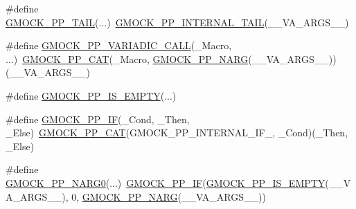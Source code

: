 \begin{DoxyCompactItemize}
\item 
\#define \mbox{\hyperlink{googletest-master_2googlemock_2include_2gmock_2internal_2gmock-pp_8h_a1373615930e6eb6772c914fa8416f88e}{G\+M\+O\+C\+K\+\_\+\+P\+P\+\_\+\+T\+A\+IL}}(...)~\mbox{\hyperlink{_obj__test_2lib_2googletest-master_2googlemock_2include_2gmock_2internal_2gmock-pp_8h_a0e7741e9333e33780a56a8c5e2079942}{G\+M\+O\+C\+K\+\_\+\+P\+P\+\_\+\+I\+N\+T\+E\+R\+N\+A\+L\+\_\+\+T\+A\+IL}}(\+\_\+\+\_\+\+V\+A\+\_\+\+A\+R\+G\+S\+\_\+\+\_\+)
\item 
\#define \mbox{\hyperlink{googletest-master_2googlemock_2include_2gmock_2internal_2gmock-pp_8h_a4dd8715f753c7c3957f7185acf609e55}{G\+M\+O\+C\+K\+\_\+\+P\+P\+\_\+\+V\+A\+R\+I\+A\+D\+I\+C\+\_\+\+C\+A\+LL}}(\+\_\+\+Macro, ...)~\mbox{\hyperlink{_obj__test_2lib_2googletest-master_2googlemock_2include_2gmock_2internal_2gmock-pp_8h_a108c52ffa81ab99348d23b8fa76fded3}{G\+M\+O\+C\+K\+\_\+\+P\+P\+\_\+\+C\+AT}}(\+\_\+\+Macro, \mbox{\hyperlink{_obj__test_2lib_2googletest-master_2googlemock_2include_2gmock_2internal_2gmock-pp_8h_a9db18220b88597a07704bc7cf3b13304}{G\+M\+O\+C\+K\+\_\+\+P\+P\+\_\+\+N\+A\+RG}}(\+\_\+\+\_\+\+V\+A\+\_\+\+A\+R\+G\+S\+\_\+\+\_\+))(\+\_\+\+\_\+\+V\+A\+\_\+\+A\+R\+G\+S\+\_\+\+\_\+)
\item 
\#define \mbox{\hyperlink{googletest-master_2googlemock_2include_2gmock_2internal_2gmock-pp_8h_a14eb10c5cc7380d072cd748661140f45}{G\+M\+O\+C\+K\+\_\+\+P\+P\+\_\+\+I\+S\+\_\+\+E\+M\+P\+TY}}(...)
\item 
\#define \mbox{\hyperlink{googletest-master_2googlemock_2include_2gmock_2internal_2gmock-pp_8h_a82f153fedbaf56bf71b8272bdf672875}{G\+M\+O\+C\+K\+\_\+\+P\+P\+\_\+\+IF}}(\+\_\+\+Cond,  \+\_\+\+Then,  \+\_\+\+Else)~\mbox{\hyperlink{_obj__test_2lib_2googletest-master_2googlemock_2include_2gmock_2internal_2gmock-pp_8h_a108c52ffa81ab99348d23b8fa76fded3}{G\+M\+O\+C\+K\+\_\+\+P\+P\+\_\+\+C\+AT}}(G\+M\+O\+C\+K\+\_\+\+P\+P\+\_\+\+I\+N\+T\+E\+R\+N\+A\+L\+\_\+\+I\+F\+\_\+, \+\_\+\+Cond)(\+\_\+\+Then, \+\_\+\+Else)
\item 
\#define \mbox{\hyperlink{googletest-master_2googlemock_2include_2gmock_2internal_2gmock-pp_8h_a0f49faf3c63534a722e2f320ff8d4cd0}{G\+M\+O\+C\+K\+\_\+\+P\+P\+\_\+\+N\+A\+R\+G0}}(...)~\mbox{\hyperlink{_obj__test_2lib_2googletest-master_2googlemock_2include_2gmock_2internal_2gmock-pp_8h_a82f153fedbaf56bf71b8272bdf672875}{G\+M\+O\+C\+K\+\_\+\+P\+P\+\_\+\+IF}}(\mbox{\hyperlink{_obj__test_2lib_2googletest-master_2googlemock_2include_2gmock_2internal_2gmock-pp_8h_a14eb10c5cc7380d072cd748661140f45}{G\+M\+O\+C\+K\+\_\+\+P\+P\+\_\+\+I\+S\+\_\+\+E\+M\+P\+TY}}(\+\_\+\+\_\+\+V\+A\+\_\+\+A\+R\+G\+S\+\_\+\+\_\+), 0, \mbox{\hyperlink{_obj__test_2lib_2googletest-master_2googlemock_2include_2gmock_2internal_2gmock-pp_8h_a9db18220b88597a07704bc7cf3b13304}{G\+M\+O\+C\+K\+\_\+\+P\+P\+\_\+\+N\+A\+RG}}(\+\_\+\+\_\+\+V\+A\+\_\+\+A\+R\+G\+S\+\_\+\+\_\+))

\end{DoxyCompactItemize}
